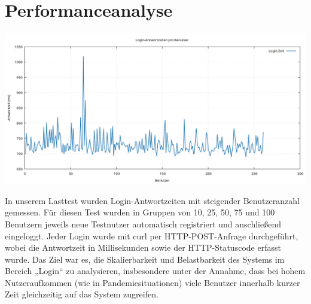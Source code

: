 \section*{Performanceanalyse}

\begin{center}
  \includegraphics[width=0.95\linewidth, height=0.45\textheight, keepaspectratio]{src/abbildungen/login_lasttest.png}
\end{center}

In unserem Lasttest wurden Login-Antwortzeiten mit steigender Benutzeranzahl gemessen. 
Für diesen Test wurden in Gruppen von 10, 25, 50, 75 und 100 Benutzern jeweils neue Testnutzer automatisch registriert und anschließend eingeloggt. Jeder Login wurde mit curl per HTTP-POST-Anfrage durchgeführt, wobei die Antwortzeit in Millisekunden 
sowie der HTTP-Statuscode erfasst wurde. Das Ziel war es, die Skalierbarkeit und Belastbarkeit des Systems im Bereich „Login“ zu analysieren, insbesondere unter der Annahme, dass bei hohem Nutzeraufkommen (wie in Pandemiesituationen) viele Benutzer innerhalb kurzer Zeit gleichzeitig auf das System zugreifen.

